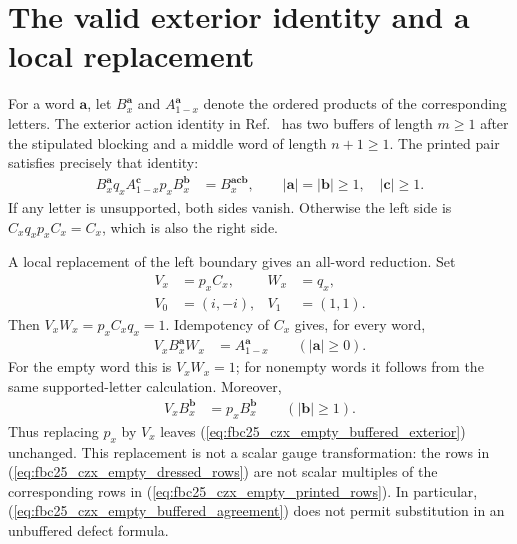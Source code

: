 \documentclass{article}
\begin{document}
\section{The valid exterior identity and a local replacement}

For a word $\mathbf a$, let $B_x^{\mathbf a}$ and
$A_{1-x}^{\mathbf a}$ denote the ordered products of the corresponding
letters. The exterior action identity
 in
Ref.~\cite[lines~1788--1838]{FrancoRubio2025MPUGauging} has two buffers of
length $m\geq1$ after the stipulated blocking and a middle word of length
$n+1\geq1$. The printed pair satisfies precisely that identity:
\begin{align}
    B_x^{\mathbf a}q_x A_{1-x}^{\mathbf c}p_x B_x^{\mathbf b}
     & =B_x^{\mathbf a\mathbf c\mathbf b},
    \qquad |\mathbf a|=|\mathbf b|\geq1,\quad |\mathbf c|\geq1.
    \label{eq:fbc25_czx_empty_buffered_exterior}
\end{align}
If any letter is unsupported, both sides vanish. Otherwise the left side is
$C_xq_xp_xC_x=C_x$, which is also the right side.

A local replacement of the left boundary gives an all-word reduction. Set
\begin{align}
    V_x & =p_xC_x, & W_x & =q_x,
    \label{eq:fbc25_czx_empty_dressed_pair} \\
    V_0 & =(i,-i), & V_1 & =(1,1).
    \label{eq:fbc25_czx_empty_dressed_rows}
\end{align}
Then $V_xW_x=p_xC_xq_x=1$. Idempotency of $C_x$ gives, for every word,
\begin{align}
    V_xB_x^{\mathbf a}W_x & =A_{1-x}^{\mathbf a}
    \qquad (|\mathbf a|\geq0).
    \label{eq:fbc25_czx_empty_dressed_reduction}
\end{align}
For the empty word this is $V_xW_x=1$; for nonempty words it follows from
the same supported-letter calculation. Moreover,
\begin{align}
    V_xB_x^{\mathbf b} & =p_xB_x^{\mathbf b}
    \qquad (|\mathbf b|\geq1).
    \label{eq:fbc25_czx_empty_buffered_agreement}
\end{align}
Thus replacing $p_x$ by $V_x$ leaves
(\ref{eq:fbc25_czx_empty_buffered_exterior}) unchanged. This replacement
is not a scalar gauge transformation: the rows in
(\ref{eq:fbc25_czx_empty_dressed_rows}) are not scalar multiples of the
corresponding rows in (\ref{eq:fbc25_czx_empty_printed_rows}). In particular,
(\ref{eq:fbc25_czx_empty_buffered_agreement}) does not permit substitution
in an unbuffered defect formula.
\end{document}
